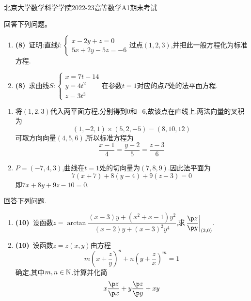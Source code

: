 \documentclass{ctexart}
\begin{document}
\pagestyle{empty}
\begin{center}\Large
北京大学数学科学学院2022-23高等数学A1期末考试
\end{center}
\begin{problem}[1.(16\songti{分})]
回答下列问题。
        \begin{enumerate}[label=\tbf{(\arabic*)}]
            \item \textbf{(8)}\ 证明:直线$l:\left\{\begin{array}{l}
                    x-2y+z=0\\
                    5x+2y-5z=-6
                \end{array}\right.$过点$(1,2,3)$,并把此一般方程化为标准方程.
            \item \textbf{(8)}\ 求曲线$S:\left\{\begin{array}{l}
                    x=7t-14\\
                    y=4t^2\\
                    z=3t^3    
                \end{array}\right.$在参数$t=1$对应的点$P$处的法平面方程.
        \end{enumerate}
\end{problem}
\begin{solution}
\begin{enumerate}[label=\tbf{(\arabic*)},leftmargin=*]
\item 将$(1,2,3)$代入两平面方程,分别得到$0$和$-6$,故该点在直线上.两法向量的叉积为
\[(1,-2,1)\times(5,2,-5)=(8,10,12)\]
可取方向向量$(4,5,6)$,所以标准方程为
\[\dfrac{x-1}{4}=\dfrac{y-2}{5}=\dfrac{z-3}{6}\]
\item $P=(-7,4,3)$,曲线在$t=1$处的切向量为$(7,8,9)$.因此法平面为
\[7(x+7)+8(y-4)+9(z-3)=0\]
即$7x+8y+9z-10=0$.
\end{enumerate}
\end{solution}
\begin{problem}[2.(20\songti{分})]
回答下列问题.
        \begin{enumerate}[label=\tbf{(\arabic*)}]
            \item \textbf{(10)}\ 设函数$z=\arctan\dfrac{(x-3)y+(x^2+x-1)y^2}{(x-2)y+(x-3)^2y^4}$,求$\left.\dfrac{\p z}{\p y}\right|_{(3,0)}$.
            \item \textbf{(10)}\ 设函数$z=z(x,y)$由方程\[m\left(x+\dfrac zy\right)^n+n\left(y+\dfrac zx\right)^m=1\]确定,其中$m,n\in\mathbb{N}$.计算并化简\[x\dfrac{\p z}{\p x}+y\dfrac{\p z}{\p y}+xy\]
        \end{enumerate}
\end{problem}
\end{document}
